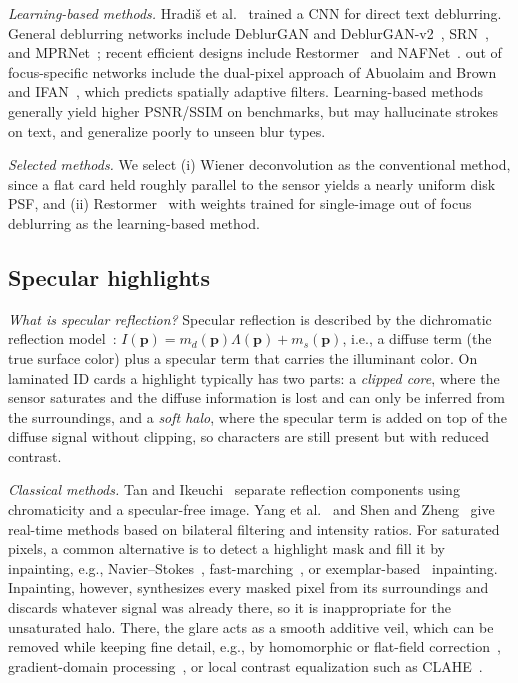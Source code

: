 \documentclass{article}
\begin{document}
\textit{Learning-based methods.} Hradi\v{s} et al.~\cite{hradis2015} trained a CNN for direct text deblurring. General deblurring networks include DeblurGAN and DeblurGAN-v2~\cite{kupyn2018,kupyn2019}, SRN~\cite{tao2018}, and MPRNet~\cite{zamir2021}; recent efficient designs include Restormer~\cite{zamir2022} and NAFNet~\cite{chen2022}. out of focus-specific networks include the dual-pixel approach of Abuolaim and Brown~\cite{abuolaim2020} and IFAN~\cite{lee2021}, which predicts spatially adaptive filters. Learning-based methods generally yield higher PSNR/SSIM on benchmarks, but may hallucinate strokes on text, and generalize poorly to unseen blur types.

\textit{Selected methods.} We select (i) Wiener deconvolution as the conventional method, since a flat card held roughly parallel to the sensor yields a nearly uniform disk PSF, and (ii) Restormer~\cite{zamir2022} with weights trained for single-image out of focus deblurring as the learning-based method.

\subsection{Specular highlights}
\textit{What is specular reflection?}
Specular reflection is described by the dichromatic reflection model~\cite{shafer1985}: $I(\mathbf{p}) = m_d(\mathbf{p})\Lambda(\mathbf{p}) + m_s(\mathbf{p})$, i.e., a diffuse term (the true surface color) plus a specular term that carries the illuminant color. On laminated ID cards a highlight typically has two parts: a \emph{clipped core}, where the sensor saturates and the diffuse information is lost and can only be inferred from the surroundings, and a \emph{soft halo}, where the specular term is added on top of the diffuse signal without clipping, so characters are still present but with reduced contrast.

\textit{Classical methods.} Tan and Ikeuchi~\cite{tan2005} separate reflection components using chromaticity and a specular-free image. Yang et al.~\cite{yang2010} and Shen and Zheng~\cite{shen2013} give real-time methods based on bilateral filtering and intensity ratios. For saturated pixels, a common alternative is to detect a highlight mask and fill it by inpainting, e.g., Navier--Stokes~\cite{bertalmio2001}, fast-marching~\cite{telea2004}, or exemplar-based~\cite{criminisi2004} inpainting. Inpainting, however, synthesizes every masked pixel from its surroundings and discards whatever signal was already there, so it is inappropriate for the unsaturated halo. There, the glare acts as a smooth additive veil, which can be removed while keeping fine detail, e.g., by homomorphic or flat-field correction~\cite{gonzalez2018}, gradient-domain processing~\cite{perez2003}, or local contrast equalization such as CLAHE~\cite{zuiderveld1994}.
\end{document}
